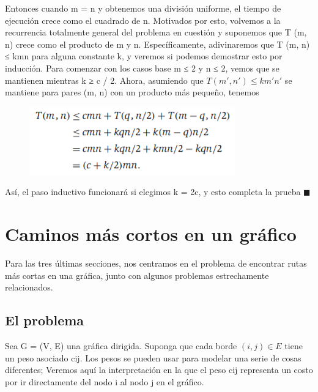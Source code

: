 \documentclass[a4paper, 12pt]{book}
\theoremstyle{dotless}
\begin{document}
Entonces cuando m = n y obtenemos una división uniforme, el tiempo de ejecución crece como el cuadrado de n. Motivados por esto, volvemos a la recurrencia totalmente general del problema en cuestión y suponemos que T (m, n) crece como el producto de m y n. Específicamente, adivinaremos que T (m, n) ≤ kmn para alguna constante k, y veremos si podemos demostrar esto por inducción. Para comenzar con los casos base m ≤ 2 y n ≤ 2, vemos que se mantienen mientras k ≥ c / 2. Ahora, asumiendo que $ T (m ', n') ≤ km'n '$ se mantiene para pares (m, n) con un producto más pequeño, tenemos\\


\begin{figure}[h]
\centering
\includegraphics[scale=1]{Imagenes-Seccion6/form6_3.PNG}
\end{figure}

Así, el paso inductivo funcionará si elegimos k = 2c, y esto completa la prueba $\blacksquare$\\

\section{Caminos más cortos en un gráfico}

Para las tres últimas secciones, nos centramos en el problema de encontrar rutas más cortas en una gráfica, junto con algunos problemas estrechamente relacionados.\\

\subsection*{El problema}

Sea G = (V, E) una gráfica dirigida. Suponga que cada borde $(i, j)  \in  E$ tiene un peso asociado cij. Los pesos se pueden usar para modelar una serie de cosas diferentes; Veremos aquí la interpretación en la que el peso cij representa un costo por ir directamente del nodo i al nodo j en el gráfico.\\
\end{document}

